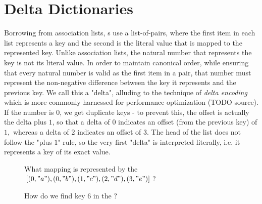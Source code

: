 \section{Delta Dictionaries}
\label{sec:DD}
Borrowing from association lists, {\dd}s use a list-of-pairs, where the first item in each list represents
a key and the second is the literal value that is mapped to the represented key. Unlike association lists,
the natural number that represents the key is not its literal value. In order to maintain canonical order,
while ensuring that every natural number is valid as the first item in a pair, that number must represent
the non-negative difference between the key it represents and the previous key. We call this a "delta",
alluding to the technique of \emph{delta encoding} which is more commonly harnessed for performance
optimization (TODO source). If the number is $0$, we get duplicate keys - to prevent this, the offset is
actually the delta plus $1$, so that a delta of $0$ indicates an offset (from the previous key) of $1$,\
whereas a delta of $2$ indicates an offset of $3$. The head of the list does not follow the "plus $1$"
rule, so the very first "delta" is interpreted literally, i.e. it represents a key of its exact
value.

\begin{figure}[H]
  \centering
  \caption{What mapping is represented by the \dd~ $[(0, "a"), (0, "b"), (1, "c"), (2, "d"), (3, "e")]$?}
  \label{fig:mech1}
\end{figure}

\begin{figure}[H]
  \centering
  \caption{How do we find key $6$ in the \dd?}
  \label{fig:find-6}
\end{figure}

